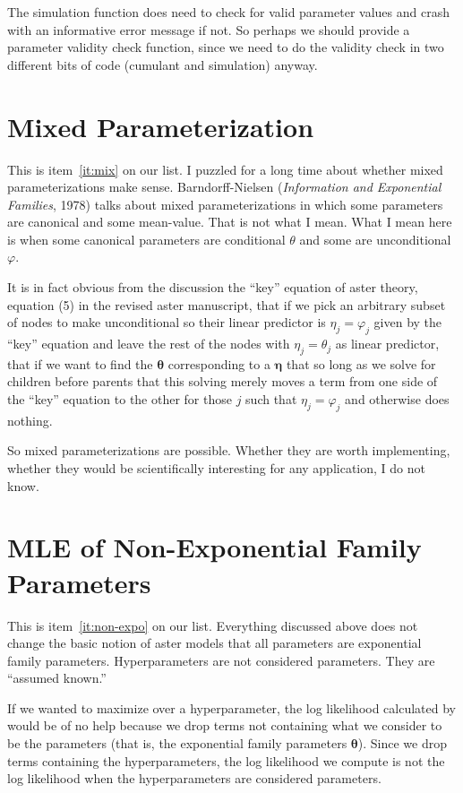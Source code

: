 \documentclass[11pt]{article}
\newcommand{\boldeta}{\boldsymbol{\eta}}
\newcommand{\boldtheta}{\boldsymbol{\theta}}
\begin{document}
The simulation function does need to check for valid parameter values
and crash with an informative error message if not.  So perhaps we
should provide a parameter validity check function, since we need to
do the validity check in two different bits of code (cumulant and simulation)
anyway.

\section{Mixed Parameterization} \label{sec:mix}

This is item~\ref{it:mix} on our list.
I puzzled for a long time about whether mixed parameterizations make sense.
Barndorff-Nielsen (\emph{Information and Exponential Families}, 1978)
talks about mixed parameterizations in which
some parameters are canonical and some mean-value.  That is not what I mean.
What I mean here is when some canonical parameters are conditional
$\theta$ and some are unconditional $\varphi$.

It is in fact obvious from the discussion the ``key''
equation of aster theory, equation (5) in the revised aster manuscript,
that if we pick an arbitrary subset of nodes to make unconditional
so their linear predictor is $\eta_j = \varphi_j$ given by the ``key'' equation
and leave the rest of the nodes with $\eta_j = \theta_j$ as linear predictor,
that if we want to find the $\boldtheta$ corresponding to a $\boldeta$ that
so long as we solve for children before parents that this solving
merely moves a term from one side of the ``key'' equation to the other
for those $j$ such that $\eta_j = \varphi_j$ and otherwise does nothing.

So mixed parameterizations are possible.  Whether they are worth implementing,
whether they would be scientifically interesting for any application, I do not
know.

\section{MLE of Non-Exponential Family Parameters}
\label{sec:non-expo}

This is item~\ref{it:non-expo} on our list.
Everything discussed above does not change the basic notion of aster models
that all parameters are exponential family parameters.  Hyperparameters
are not considered parameters.  They are ``assumed known.''

If we wanted to maximize over a hyperparameter, the log likelihood
calculated by \verb@mlogl@ would be of no help because we drop terms
not containing what we consider to be the parameters (that is, the
exponential family parameters $\boldtheta$).  Since we drop terms
containing the hyperparameters, the log likelihood we compute is not
the log likelihood when the hyperparameters are considered parameters.
\end{document}
